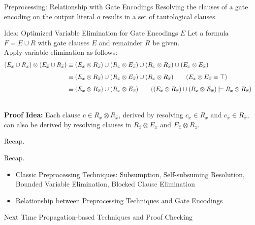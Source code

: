 \documentclass[t]{sdqbeamer}
\begin{document}
\begin{frame}{Preprocessing: Relationship with Gate Encodings}
Resolving the clauses of a gate encoding on the output literal $o$ results in a set of tautological clauses.\\[1em]
\begin{block}{Idea: Optimized Variable Elimination for Gate Encodings $E$}
Let a formula $F = E \cup R$ with gate clauses $E$ and remainder $R$ be given.\\
Apply variable elimination as follows:
\vspace*{-1ex}
\begin{align*}
( E_x \cup R_x) \otimes (E_{\overline x} \cup R_{\overline x}) 
&\equiv (E_x \otimes R_{\overline x}) \cup (R_x \otimes E_{\overline x}) \cup (R_x \otimes R_{\overline x}) \cup (E_x \otimes E_{\overline x})\\[1ex]
%
&\equiv (E_x \otimes R_{\overline x}) \cup (R_x \otimes E_{\overline x}) \cup (R_x \otimes R_{\overline x}) \tag{$E_x \otimes E_{\overline x} \equiv \top$}\\[1ex]
&\equiv (E_x \otimes R_{\overline x}) \cup (R_x \otimes E_{\overline x})
\tag{$(E_x \otimes R_{\overline x}) \cup (R_x \otimes E_{\overline x}) \models R_x \otimes R_{\overline x}$}
\end{align*}
\end{block}~\\[-1ex]
\textbf{Proof Idea:} Each clause $c \in R_x \otimes R_{\overline x}$, derived by resolving $c_x \in R_x$ and $c_{\overline x} \in R_{\overline x}$, can also be derived by resolving clauses in $R_{\overline x} \otimes E_x$ and $E_{\overline x} \otimes R_x$.
\end{frame}

\begin{frame}{Recap.}
\begin{block}{Recap.}
\begin{itemize}
    \item Classic Preprocessing Techniques: Subsumption, Self-subsuming Resolution, Bounded Variable Elimination, Blocked Clause Elimination
    \item Relationship between Preprocessing Techniques and Gate Encodings
\end{itemize}
\end{block}
\begin{block}{Next Time}
Propagation-based Techniques and Proof Checking
\end{block}
\end{frame}
\end{document}

